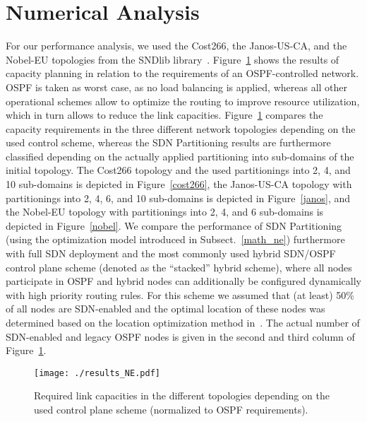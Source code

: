 \documentclass[journal]{IEEEtran}
\begin{document}
\section{Numerical Analysis}\label{results}
For our performance analysis, we used the Cost266, the Janos-US-CA, and the Nobel-EU topologies from the SNDlib library~\cite{sndlib}. Figure~\ref{results_NE} shows the results of capacity planning in relation to the requirements of an OSPF-controlled network. OSPF is taken as worst case, as no load balancing is applied, whereas all other operational schemes allow to optimize the routing to improve resource utilization, which in turn allows to reduce the link capacities. Figure~\ref{results_NE} compares the capacity requirements in the three different network topologies depending on the used control scheme, whereas the SDN Partitioning results are furthermore classified depending on the actually applied partitioning into sub-domains of the initial topology. The Cost266 topology and the used partitionings into 2, 4, and 10 sub-domains is depicted in Figure~\ref{cost266}, the Janos-US-CA topology with partitionings into 2, 4, 6, and 10 sub-domains is depicted in Figure~\ref{janos}, and the Nobel-EU topology with partitionings into 2, 4, and 6 sub-domains is depicted in Figure~\ref{nobel}. We compare the performance of SDN Partitioning (using the optimization model introduced in Subsect.~\ref{math_ne}) furthermore with full SDN deployment and the most commonly used hybrid SDN/OSPF control plane scheme (denoted as the ``stacked'' hybrid scheme), where all nodes participate in OSPF and hybrid nodes can additionally be configured dynamically with high priority routing rules. For this scheme we assumed that (at least) 50\% of all nodes are SDN-enabled and the optimal location of these nodes was determined based on the location optimization method in~\cite{hybrid_2}. The actual number of SDN-enabled and legacy OSPF nodes is given in the second and third column of Figure~\ref{results_NE}.

\begin{figure}[t] \center
\texttt{[image: ./results\_NE.pdf]}
\caption{Required link capacities in the different topologies depending on the used control plane scheme (normalized to OSPF requirements).}
\label{results_NE} \end{figure}
\end{document}
